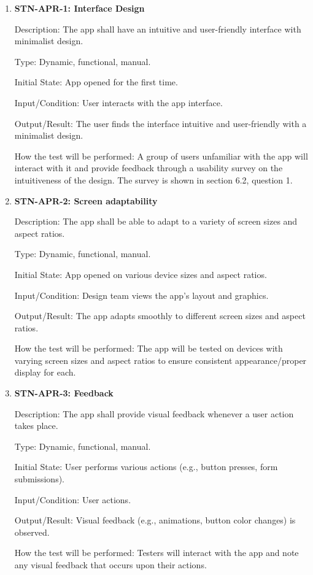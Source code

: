 \documentclass[12pt, titlepage]{article}
\begin{document}
\begin{enumerate}

\item \textbf{STN-APR-1: Interface Design}

Description: The app shall have an intuitive and user-friendly interface with minimalist design. 

Type: Dynamic, functional, manual.

Initial State: App opened for the first time.

Input/Condition: User interacts with the app interface.

Output/Result: The user finds the interface intuitive and user-friendly with a minimalist design.

How the test will be performed: A group of users unfamiliar with the app will interact with it and provide feedback through a usability survey on the intuitiveness of the design. The survey is shown in section 6.2, question 1.  

\item\textbf{STN-APR-2: Screen adaptability}

Description: The app shall be able to adapt to a variety of screen sizes and aspect ratios.

Type: Dynamic, functional, manual.

Initial State: App opened on various device sizes and aspect ratios.

Input/Condition: Design team views the app's layout and graphics.

Output/Result: The app adapts smoothly to different screen sizes and aspect ratios.

How the test will be performed: The app will be tested on devices with varying screen sizes and aspect ratios to ensure consistent appearance/proper display for each.


\item \textbf{STN-APR-3: Feedback}

Description: The app shall provide visual feedback whenever a user action takes place.

Type: Dynamic, functional, manual.

Initial State: User performs various actions (e.g., button presses, form submissions).

Input/Condition: User actions.

Output/Result: Visual feedback (e.g., animations, button color changes) is observed.

How the test will be performed: Testers will interact with the app and note any visual feedback that occurs upon their actions.



\end{enumerate}
\end{document}
